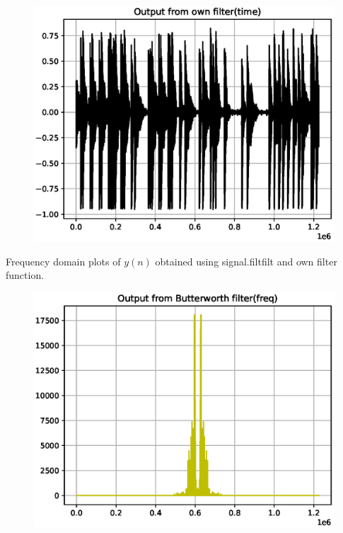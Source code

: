 \documentclass[journal,12pt,twocolumn]{IEEEtran}
\begin{document}
\begin{figure}[!ht]
\centering
\includegraphics[width=1\columnwidth,height=0.8\columnwidth]{./figs/ee18btech11030_1.eps}
\caption{}
\label{fig:ee18btech11030_1}
\end{figure} 
\newpage

Frequency domain plots of $y(n)$ obtained using signal.filtfilt and own filter function.
\begin{figure}[!ht]
\centering
\includegraphics[width=1\columnwidth,height=0.8\columnwidth]{./figs/ee18btech11030_2.eps}
\caption{}
\label{fig:ee18btech11030_2}
\end{figure}
\end{document}
